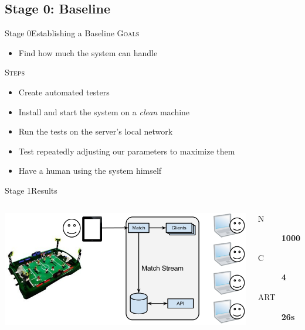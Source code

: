 \documentclass[utf8]{beamer}
\begin{document}
\subsection{Stage 0: Baseline}
\begin{frame}{Stage 0}{Establishing a Baseline}
	\textsc{Goals}
	\begin{itemize}
		\item Find how much the system can handle
	\end{itemize}
	\pause
	\textsc{Steps}
	\begin{itemize}
		\item Create automated testers
		\item Install and start the system on a \emph{clean} machine
		\item Run the tests on the server's local network
		\item Test repeatedly adjusting our parameters to maximize them
		\item Have a human using the system himself
	\end{itemize}
\end{frame}
\begin{frame}{Stage 1}{Results}
	\begin{columns}
			\includegraphics[top=-1,width=\textwidth]{img/results-1.png}
			\begin{description}
				\item[N] \textbf{\color{red}\Large 1000}
				\item[C] \textbf{\color{red}\Large 4}
				\item[ART] \textbf{\color{red}\Large 26s}
			\end{description}
	\end{columns}
\end{frame}
\end{document}
